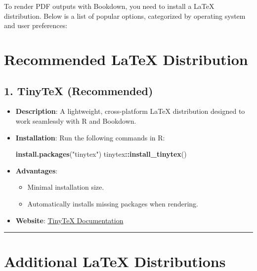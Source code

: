 \documentclass[
]{book}
\newenvironment{Shaded}{\begin{snugshade}}{\end{snugshade}}
\newcommand{\FunctionTok}[1]{\textcolor[rgb]{0.13,0.29,0.53}{\textbf{#1}}}
\newcommand{\NormalTok}[1]{#1}
\newcommand{\SpecialCharTok}[1]{\textcolor[rgb]{0.81,0.36,0.00}{\textbf{#1}}}
\newcommand{\StringTok}[1]{\textcolor[rgb]{0.31,0.60,0.02}{#1}}
\providecommand{\tightlist}{%
  \setlength{\itemsep}{0pt}\setlength{\parskip}{0pt}}
\theoremstyle{definition}
\theoremstyle{definition}
\theoremstyle{definition}
\theoremstyle{definition}
\theoremstyle{remark}
\begin{document}
To render PDF outputs with Bookdown, you need to install a LaTeX distribution. Below is a list of popular options, categorized by operating system and user preferences:

\section{Recommended LaTeX Distribution}\label{recommended-latex-distribution}

\subsection{\texorpdfstring{1. \textbf{TinyTeX} (Recommended)}{1. TinyTeX (Recommended)}}\label{tinytex-recommended-1}

\begin{itemize}
\item
  \textbf{Description}: A lightweight, cross-platform LaTeX distribution designed to work seamlessly with R and Bookdown.
\item
  \textbf{Installation}: Run the following commands in R:

\begin{Shaded}
\begin{Highlighting}[]
\FunctionTok{install.packages}\NormalTok{(}\StringTok{"tinytex"}\NormalTok{)}
\NormalTok{tinytex}\SpecialCharTok{::}\FunctionTok{install\_tinytex}\NormalTok{()}
\end{Highlighting}
\end{Shaded}
\item
  \textbf{Advantages}:

  \begin{itemize}
  \tightlist
  \item
    Minimal installation size.
  \item
    Automatically installs missing packages when rendering.
  \end{itemize}
\item
  \textbf{Website}: \href{https://yihui.org/tinytex/}{TinyTeX Documentation}
\end{itemize}

\begin{center}\rule{0.5\linewidth}{0.5pt}\end{center}

\section{Additional LaTeX Distributions}\label{additional-latex-distributions-1}
\end{document}

